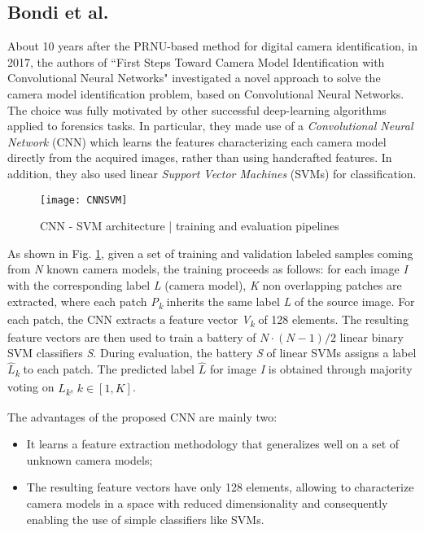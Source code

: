 \subsection{Bondi et al.}
About 10 years after the PRNU-based method for digital camera identification, in 2017, the authors of ``First Steps Toward Camera Model Identification with Convolutional Neural Networks" investigated a novel approach to solve the camera model identification problem, based on Convolutional Neural Networks. The choice was fully motivated by other successful deep-learning algorithms applied to forensics tasks.
In particular, they made use of a \textit{Convolutional Neural Network} (CNN) which learns the features characterizing each camera model directly from the acquired images, rather than using handcrafted features. In addition, they also used linear \textit{Support Vector Machines} (SVMs) for classification.

\begin{figure}[ht]
	\centering
	\texttt{[image: CNNSVM]}
	\caption{CNN - SVM architecture | training and evaluation pipelines}
	\label{fig:CNNSVM}
\end{figure}

As shown in Fig. \ref{fig:CNNSVM}, given a set of training and validation labeled samples coming from \textit{N} known camera models, the training proceeds as follows:
for each image \textit{I} with the corresponding label \textit{L} (camera model), \textit{K} non overlapping patches are extracted, where each patch \textit{P\textsubscript{k}} inherits the same label \textit{L} of the source image. For each patch, the CNN extracts a feature vector \textit{V\textsubscript{k}} of 128 elements. The resulting feature vectors are then used to train a battery of $ N \cdot (N - 1)/2 $ linear binary SVM classifiers \textit{S}. 
During evaluation, the battery \textit{S} of linear SVMs assigns a label $\hat{L}$\textit{\textsubscript{k}} to each patch. The predicted label $\hat{L}$ for image \textit{I} is obtained through majority voting on $\hat{L}$\textit{\textsubscript{k}}, $k \in [1, K]$.

The advantages of the proposed CNN are mainly two:
\begin{itemize}
	\item It learns a feature extraction methodology that generalizes well on a set of unknown camera models;
	\item The resulting feature vectors have only 128 elements, allowing to characterize camera models in a space with reduced dimensionality and  consequently enabling the use of simple classifiers like SVMs.
\end{itemize}

